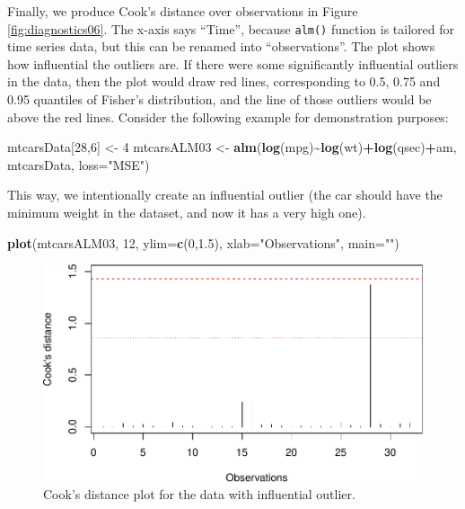 \documentclass[
]{book}
\newenvironment{Shaded}{\begin{snugshade}}{\end{snugshade}}
\newcommand{\AttributeTok}[1]{\textcolor[rgb]{0.13,0.29,0.53}{#1}}
\newcommand{\DecValTok}[1]{\textcolor[rgb]{0.00,0.00,0.81}{#1}}
\newcommand{\FloatTok}[1]{\textcolor[rgb]{0.00,0.00,0.81}{#1}}
\newcommand{\FunctionTok}[1]{\textcolor[rgb]{0.13,0.29,0.53}{\textbf{#1}}}
\newcommand{\NormalTok}[1]{#1}
\newcommand{\OtherTok}[1]{\textcolor[rgb]{0.56,0.35,0.01}{#1}}
\newcommand{\SpecialCharTok}[1]{\textcolor[rgb]{0.81,0.36,0.00}{\textbf{#1}}}
\newcommand{\StringTok}[1]{\textcolor[rgb]{0.31,0.60,0.02}{#1}}
\theoremstyle{definition}
\theoremstyle{definition}
\theoremstyle{definition}
\theoremstyle{definition}
\theoremstyle{remark}
\begin{document}
Finally, we produce Cook's distance over observations in Figure \ref{fig:diagnostics06}. The x-axis says ``Time'', because \texttt{alm()} function is tailored for time series data, but this can be renamed into ``observations''. The plot shows how influential the outliers are. If there were some significantly influential outliers in the data, then the plot would draw red lines, corresponding to 0.5, 0.75 and 0.95 quantiles of Fisher's distribution, and the line of those outliers would be above the red lines. Consider the following example for demonstration purposes:

\begin{Shaded}
\begin{Highlighting}[]
\NormalTok{mtcarsData[}\DecValTok{28}\NormalTok{,}\DecValTok{6}\NormalTok{] }\OtherTok{\textless{}{-}} \DecValTok{4}
\NormalTok{mtcarsALM03 }\OtherTok{\textless{}{-}} \FunctionTok{alm}\NormalTok{(}\FunctionTok{log}\NormalTok{(mpg)}\SpecialCharTok{\textasciitilde{}}\FunctionTok{log}\NormalTok{(wt)}\SpecialCharTok{+}\FunctionTok{log}\NormalTok{(qsec)}\SpecialCharTok{+}\NormalTok{am, mtcarsData, }\AttributeTok{loss=}\StringTok{"MSE"}\NormalTok{)}
\end{Highlighting}
\end{Shaded}

This way, we intentionally create an influential outlier (the car should have the minimum weight in the dataset, and now it has a very high one).

\begin{Shaded}
\begin{Highlighting}[]
\FunctionTok{plot}\NormalTok{(mtcarsALM03, }\DecValTok{12}\NormalTok{, }\AttributeTok{ylim=}\FunctionTok{c}\NormalTok{(}\DecValTok{0}\NormalTok{,}\FloatTok{1.5}\NormalTok{), }\AttributeTok{xlab=}\StringTok{"Observations"}\NormalTok{, }\AttributeTok{main=}\StringTok{""}\NormalTok{)}
\end{Highlighting}
\end{Shaded}

\begin{figure}
\centering
\includegraphics{Svetunkov---Statistics-for-Business-Analytics_files/figure-latex/diagnostics07-1.pdf}
\caption{\label{fig:diagnostics07}Cook's distance plot for the data with influential outlier.}
\end{figure}
\end{document}
